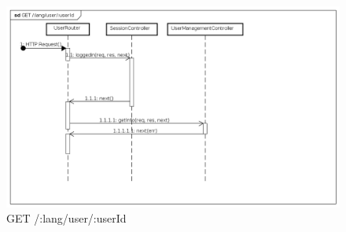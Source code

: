 \begin{itemize}
\label{Fallimento della procedura di visualizzazione dati utente}
\begin{figure}[ht]
	\centering
	\includegraphics[scale=0.40]{UML/DiagrammiDiSequenza/Back-end/GET_LangUserUseridFailure.png}
	\caption{GET /:lang/user/:userId}
\end{figure}

\FloatBarrier
\end{itemize}

